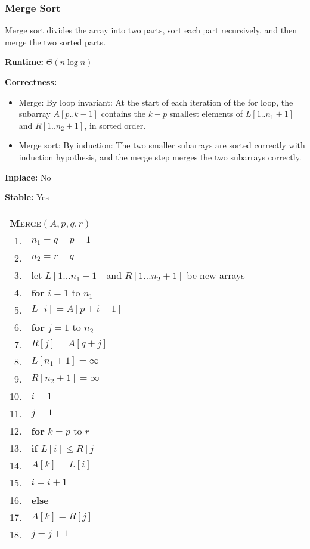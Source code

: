 \documentclass[a4paper,12pt]{article}
\begin{document}
\subsubsection{Merge Sort}

Merge sort divides the array into two parts, sort each part recursively, and then merge the two sorted parts.

\textbf{Runtime:} 
$\Theta(n \log n)$

\textbf{Correctness:} 
\begin{itemize}
	\item Merge: By loop invariant: At the start of each iteration of the for loop, the subarray $A[p..k - 1]$ contains the $k - p$ smallest elements of $L[1..n_1 + 1]$ and $R[1..n_2 + 1]$, in sorted order.
	\item Merge sort: By induction: The two smaller subarrays are sorted correctly with induction hypothesis, and the merge step merges the two subarrays correctly.
\end{itemize}

\textbf{Inplace:}
No

\textbf{Stable:}
Yes

\begin{center}
	\begin{tabular}{rl}
		\toprule
		\multicolumn{2}{l}{\textsc{Merge}$(A, p, q, r)$} \\
		\midrule
		1. & $n_1 = q - p + 1$ \\
		2. & $n_2 = r - q$ \\
		3. & let $L[1 \dots n_1 + 1]$ and $R[1 \dots n_2 + 1]$ be new arrays \\
		4. & \textbf{for} $i = 1$ to $n_1$ \\
		5. & \quad $L[i] = A[p + i - 1]$ \\
		6. & \textbf{for} $j = 1$ to $n_2$ \\
		7. & \quad $R[j] = A[q + j]$ \\
		8. & $L[n_1 + 1] = \infty$ \\
		9. & $R[n_2 + 1] = \infty$ \\
		10. & $i = 1$ \\
		11. & $j = 1$ \\
		12. & \textbf{for} $k = p$ to $r$ \\
		13. & \quad \textbf{if} $L[i] \leq R[j]$ \\
		14. & \quad \quad $A[k] = L[i]$ \\
		15. & \quad \quad $i = i + 1$ \\
		16. & \quad \textbf{else} \\
		17. & \quad \quad $A[k] = R[j]$ \\
		18. & \quad \quad $j = j + 1$ \\
		\bottomrule
	\end{tabular}
\end{center}
\end{document}
